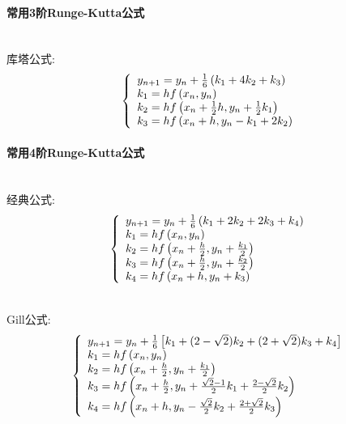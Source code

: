 \documentclass[12pt]{report}
\begin{document}
\paragraph{常用3阶Runge-Kutta公式}

~\\

库塔公式:
\begin{equation}
	\notag
	\left\{\begin{array}{l}
	y_{n+1}=y_{n}+\frac{1}{6}\left(k_{1}+4 k_{2}+k_{3}\right) \\
	k_{1}=h f\left(x_{n}, y_{n}\right) \\
	k_{2}=h f\left(x_{n}+\frac{1}{2} h, y_{n}+\frac{1}{2} k_{1}\right) \\
	k_{3}=h f\left(x_{n}+h, y_{n}-k_{1}+2 k_{2}\right)
	\end{array}\right.
\end{equation}

\paragraph{常用4阶Runge-Kutta公式}

~\\

经典公式:
\begin{equation}
	\notag
	\left\{\begin{array}{l}
	y_{n+1}=y_{n}+\frac{1}{6}\left(k_{1}+2 k_{2}+2 k_{3}+k_{4}\right) \\
	k_{1}=h f\left(x_{n}, y_{n}\right) \\
	k_{2}=h f\left(x_{n}+\frac{h}{2}, y_{n}+\frac{k_{1}}{2}\right) \\
	k_{3}=h f\left(x_{n}+\frac{h}{2}, y_{n}+\frac{k_{2}}{2}\right) \\
	k_{4}=h f\left(x_{n}+h, y_{n}+k_{3}\right)
	\end{array}\right.
\end{equation}

~\\

Gill公式:
\begin{equation}
	\notag
	\left\{\begin{array}{l}
	y_{n+1}=y_{n}+\frac{1}{6}\left[k_{1}+(2-\sqrt{2}) k_{2}+(2+\sqrt{2}) k_{3}+k_{4}\right] \\
	k_{1}=h f\left(x_{n}, y_{n}\right) \\
	k_{2}=h f\left(x_{n}+\frac{h}{2}, y_{n}+\frac{k_{1}}{2}\right) \\
	k_{3}=h f\left(x_{n}+\frac{h}{2}, y_{n}+\frac{\sqrt{2}-1}{2} k_{1}+\frac{2-\sqrt{2}}{2} k_{2}\right) \\
	k_{4}=h f\left(x_{n}+h, y_{n}-\frac{\sqrt{2}}{2} k_{2}+\frac{2+\sqrt{2}}{2} k_{3}\right)
	\end{array}\right.
\end{equation}
\end{document}
